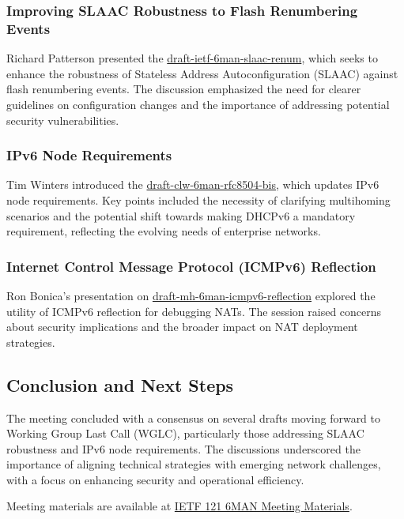 \documentclass{article}
\begin{document}
\subsubsection{Improving SLAAC Robustness to Flash Renumbering Events}
Richard Patterson presented the \href{https://datatracker.ietf.org/doc/html/draft-ietf-6man-slaac-renum}{draft-ietf-6man-slaac-renum}, which seeks to enhance the robustness of Stateless Address Autoconfiguration (SLAAC) against flash renumbering events. The discussion emphasized the need for clearer guidelines on configuration changes and the importance of addressing potential security vulnerabilities.

\subsubsection{IPv6 Node Requirements}
Tim Winters introduced the \href{https://datatracker.ietf.org/doc/html/draft-clw-6man-rfc8504-bis}{draft-clw-6man-rfc8504-bis}, which updates IPv6 node requirements. Key points included the necessity of clarifying multihoming scenarios and the potential shift towards making DHCPv6 a mandatory requirement, reflecting the evolving needs of enterprise networks.

\subsubsection{Internet Control Message Protocol (ICMPv6) Reflection}
Ron Bonica's presentation on \href{https://datatracker.ietf.org/doc/html/draft-mh-6man-icmpv6-reflection}{draft-mh-6man-icmpv6-reflection} explored the utility of ICMPv6 reflection for debugging NATs. The session raised concerns about security implications and the broader impact on NAT deployment strategies.

\subsection{Conclusion and Next Steps}
The meeting concluded with a consensus on several drafts moving forward to Working Group Last Call (WGLC), particularly those addressing SLAAC robustness and IPv6 node requirements. The discussions underscored the importance of aligning technical strategies with emerging network challenges, with a focus on enhancing security and operational efficiency.

Meeting materials are available at \href{https://datatracker.ietf.org/meeting/121/materials/agenda-121-6man-00}{IETF 121 6MAN Meeting Materials}.
\end{document}
